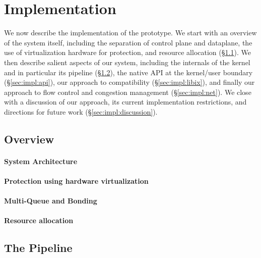 
\section{Implementation}
\label{sec:impl}

We now describe the implementation of the \ix prototype. We start with
an overview of the system itself, including the separation of control
plane and dataplane, the use of virtualization hardware for
protection, and resource allocation (\S\ref{sec:impl:overview}). We
then describe salient aspects of our system, including the internals
of the \ix kernel and in particular its pipeline
(\S\ref{sec:impl:kernel}), the native API at the kernel/user boundary
(\S\ref{sec:impl:api}), our approach to compatibility
(\S\ref{sec:impl:libix}), and finally our approach to flow control and
congestion management (\S\ref{sec:impl:net}).  We close with a
discussion of our approach, its current implementation restrictions,
and directions for future work (\S\ref{sec:impl:discussion}).


\subsection{Overview}
\label{sec:impl:overview}

\paragraph{System Architecture}



\paragraph{Protection using hardware virtualization}


\paragraph{Multi-Queue and Bonding}


%


\paragraph{Resource allocation}


\subsection{The \ix Pipeline}
\label{sec:impl:kernel}

